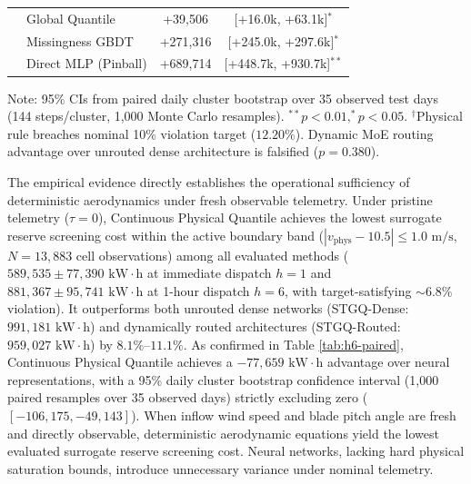 \documentclass[
  journal]{IEEEtran}
\begin{document}
\begin{table}[!htbp]
\begin{tabular*}{\columnwidth}{@{\extracolsep{\fill}}llcc@{}}
 & Global Quantile & +39,506 & [+16.0k, +63.1k]$^{\ast}$ \\
 & Missingness GBDT & +271,316 & [+245.0k, +297.6k]$^{\ast}$ \\
 & Direct MLP (Pinball) & +689,714 & [+448.7k, +930.7k]$^{\ast\ast}$ \\
\bottomrule
\end{tabular*}
\vspace{1mm}
\raggedright\fontsize{8.0pt}{8.8pt}\selectfont Note: 95\% CIs from paired daily cluster bootstrap over 35 observed test days (144 steps/cluster, 1,000 Monte Carlo resamples). $^{\ast\ast}p<0.01, ^{\ast}p<0.05$. $^{\dagger}$Physical rule breaches nominal 10\% violation target ($12.20\%$). Dynamic MoE routing advantage over unrouted dense architecture is falsified ($p=0.380$).
\end{table}

The empirical evidence directly establishes the operational sufficiency
of deterministic aerodynamics under fresh observable telemetry. Under
pristine telemetry (\(\tau = 0\)), Continuous Physical Quantile achieves
the lowest surrogate reserve screening cost within the active boundary
band (\(|v_{\text{phys}}-10.5|\le 1.0\text{ m/s}\), \(N=13{,}883\) cell
observations) among all evaluated methods
(\(589{,}535 \pm 77{,}390\text{ kW}\cdot\text{h}\) at immediate dispatch
\(h=1\) and \(881{,}367 \pm 95{,}741\text{ kW}\cdot\text{h}\) at 1-hour
dispatch \(h=6\), with target-satisfying \(\sim 6.8\%\) violation). It
outperforms both unrouted dense networks (STGQ-Dense:
\(991{,}181\text{ kW}\cdot\text{h}\)) and dynamically routed
architectures (STGQ-Routed: \(959{,}027\text{ kW}\cdot\text{h}\)) by
\(8.1\%\text{--}11.1\%\). As confirmed in Table \ref{tab:h6-paired},
Continuous Physical Quantile achieves a
\(-77{,}659\text{ kW}\cdot\text{h}\) advantage over neural
representations, with a 95\% daily cluster bootstrap confidence interval
(1,000 paired resamples over 35 observed days) strictly excluding zero
(\([-106{,}175, -49{,}143]\)). When inflow wind speed and blade pitch
angle are fresh and directly observable, deterministic aerodynamic
equations yield the lowest evaluated surrogate reserve screening cost.
Neural networks, lacking hard physical saturation bounds, introduce
unnecessary variance under nominal telemetry.
\end{document}
